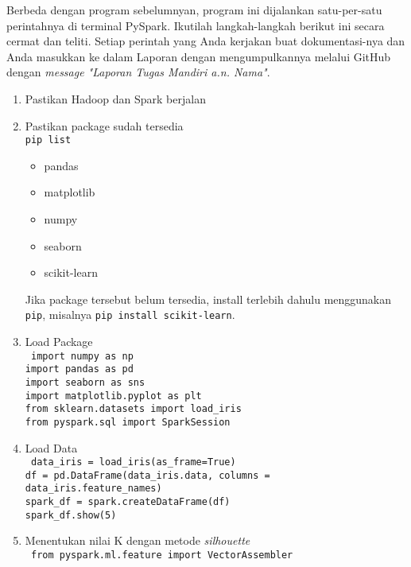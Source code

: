 \documentclass[a4paper]{tufte-handout}
\begin{document}
Berbeda dengan program sebelumnyan, program ini dijalankan satu-per-satu perintahnya di terminal PySpark. Ikutilah langkah-langkah berikut ini secara cermat dan teliti. Setiap perintah yang Anda kerjakan buat dokumentasi-nya dan Anda masukkan ke dalam Laporan dengan mengumpulkannya melalui GitHub dengan \textit{message "Laporan Tugas Mandiri a.n. Nama"}.

\begin{enumerate}
\item Pastikan Hadoop dan Spark berjalan
\item Pastikan package sudah tersedia \\
{\tt pip list}
\begin{multicols}{3}
\begin{itemize}
\item pandas
\item matplotlib
\item numpy
\item seaborn
\item scikit-learn
\end{itemize}
\end{multicols}

Jika package tersebut belum tersedia, install terlebih dahulu menggunakan {\tt pip}, misalnya {\tt pip install scikit-learn}.

\item Load Package \\
{\tt 
import numpy as np \\
import pandas as pd \\
import seaborn as sns \\
import matplotlib.pyplot as plt \\
from sklearn.datasets import load\_iris \\
from pyspark.sql import SparkSession \\
}

\item Load Data \\
{\tt
data\_iris = load\_iris(as\_frame=True) \\
df = pd.DataFrame(data\_iris.data, columns = data\_iris.feature\_names) \\
spark\_df = spark.createDataFrame(df) \\
spark\_df.show(5)
}

\item Menentukan nilai K dengan metode \textit{silhouette} \\
{\tt
from pyspark.ml.feature import VectorAssembler \\

}
\end{enumerate}
\end{document}
